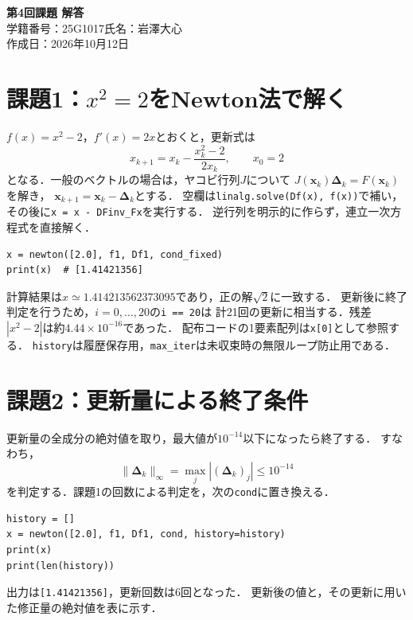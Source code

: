 \documentclass[a4paper,10pt]{article}
\begin{document}
\begin{center}
  {\LARGE\bfseries 第4回課題 解答}\\[5mm]
  学籍番号：25G1017\qquad 氏名：岩澤大心\\[2mm]
  作成日：2026年10月12日
\end{center}

\section*{課題1：$x^2=2$をNewton法で解く}
$f(x)=x^2-2$，$f'(x)=2x$とおくと，更新式は
\[
 x_{k+1}=x_k-\frac{x_k^2-2}{2x_k},\qquad x_0=2
\]
となる．一般のベクトルの場合は，ヤコビ行列$J$について
$J(\boldsymbol{x}_k)\boldsymbol{\Delta}_k=F(\boldsymbol{x}_k)$を解き，
$\boldsymbol{x}_{k+1}=\boldsymbol{x}_k-\boldsymbol{\Delta}_k$とする．
空欄は\texttt{linalg.solve(Df(x), f(x))}で補い，その後に\texttt{x = x - DFinv\_Fx}を実行する．
逆行列を明示的に作らず，連立一次方程式を直接解く．


\begin{lstlisting}
x = newton([2.0], f1, Df1, cond_fixed)
print(x)  # [1.41421356]
\end{lstlisting}
計算結果は$x\simeq1.414213562373095$であり，正の解$\sqrt{2}$に一致する．
更新後に終了判定を行うため，$i=0,\ldots,20$の\texttt{i == 20}は
計21回の更新に相当する．残差$|x^2-2|$は約$4.44\times10^{-16}$であった．
配布コードの1要素配列は\texttt{x[0]}として参照する．
\texttt{history}は履歴保存用，\texttt{max\_iter}は未収束時の無限ループ防止用である．

\newpage
\section*{課題2：更新量による終了条件}
更新量の全成分の絶対値を取り，最大値が$10^{-14}$以下になったら終了する．
すなわち，
\[
  \|\boldsymbol{\Delta}_k\|_\infty
  =\max_j|(\boldsymbol{\Delta}_k)_j|\le 10^{-14}
\]
を判定する．課題1の回数による判定を，次の\texttt{cond}に置き換える．

\begin{lstlisting}
history = []
x = newton([2.0], f1, Df1, cond, history=history)
print(x)
print(len(history))
\end{lstlisting}
出力は\texttt{[1.41421356]}，更新回数は6回となった．
更新後の値と，その更新に用いた修正量の絶対値を表に示す．
\end{document}
